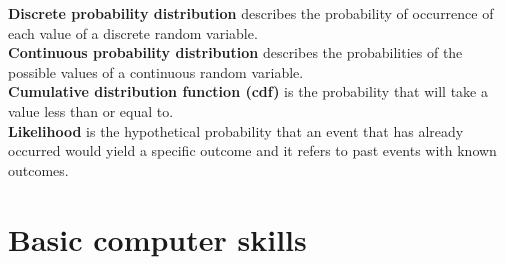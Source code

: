 \documentclass{article}
\begin{document}
\textbf{Discrete probability distribution} describes the probability of occurrence of each value of a discrete random variable.\\

\textbf{Continuous probability distribution} describes the probabilities of the possible values of a continuous random variable.\\

\textbf{Cumulative distribution function (cdf)} is the probability that will take a value less than or equal to.\\

\textbf{Likelihood} is the hypothetical probability that an event that has already occurred would yield a specific outcome and it refers to past events with known outcomes.\\
 
\section{Basic computer skills}
\end{document}
